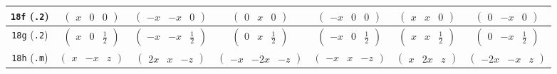 \documentclass[fleqn,9pt,landscape]{jsarticle}
\begin{document}
\begin{center}
\begin{longtable}{ccccccc}
{\tt 18f} ({\tt .2}) & $ \begin{pmatrix} x & 0 & 0 \end{pmatrix} $ & $ \begin{pmatrix} - x & - x & 0 \end{pmatrix} $ & $ \begin{pmatrix} 0 & x & 0 \end{pmatrix} $ & $ \begin{pmatrix} - x & 0 & 0 \end{pmatrix} $ & $ \begin{pmatrix} x & x & 0 \end{pmatrix} $ & $ \begin{pmatrix} 0 & - x & 0 \end{pmatrix} $ \\ \hline
{\tt 18g} ({\tt .2}) & $ \begin{pmatrix} x & 0 & \frac{1}{2} \end{pmatrix} $ & $ \begin{pmatrix} - x & - x & \frac{1}{2} \end{pmatrix} $ & $ \begin{pmatrix} 0 & x & \frac{1}{2} \end{pmatrix} $ & $ \begin{pmatrix} - x & 0 & \frac{1}{2} \end{pmatrix} $ & $ \begin{pmatrix} x & x & \frac{1}{2} \end{pmatrix} $ & $ \begin{pmatrix} 0 & - x & \frac{1}{2} \end{pmatrix} $ \\ \hline
{\tt 18h} ({\tt .m}) & $ \begin{pmatrix} x & - x & z \end{pmatrix} $ & $ \begin{pmatrix} 2 x & x & - z \end{pmatrix} $ & $ \begin{pmatrix} - x & - 2 x & - z \end{pmatrix} $ & $ \begin{pmatrix} - x & x & - z \end{pmatrix} $ & $ \begin{pmatrix} x & 2 x & z \end{pmatrix} $ & $ \begin{pmatrix} - 2 x & - x & z \end{pmatrix} $ \\ \hline

\end{longtable}
\end{center}
\end{document}
